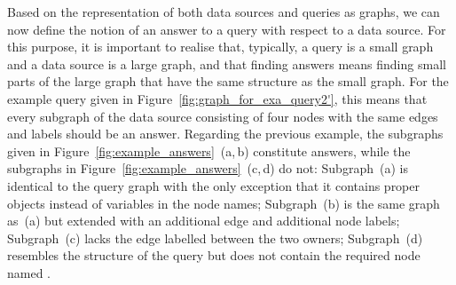 Based on the representation of both data sources and queries as graphs,
we can now define the notion of an answer to a query 
with respect to a data source. For this purpose, it is important to realise
that, typically, a query is a small graph and a data source is a large graph,
and that finding answers means finding small parts of the large graph
that have the same structure as the small graph.
For the example query given in Figure~\ref{fig:graph_for_exa_query2'},
this means that every subgraph of the data source consisting of four nodes
with the same edges and labels should be an answer.
Regarding the previous example, the subgraphs given in
Figure~\ref{fig:example_answers}~(a,\,b) constitute answers,
while the subgraphs in Figure~\ref{fig:example_answers}~(c,\,d) do not:
Subgraph~(a) is identical to the query graph with the only exception that it
contains proper objects instead of variables in the node names;
Subgraph~(b) is the same graph as~(a) but extended with an additional edge and additional node labels;
Subgraph~(c) lacks the edge labelled  between the two owners;
Subgraph~(d) resembles the structure of the query but does not contain
the required node named .

